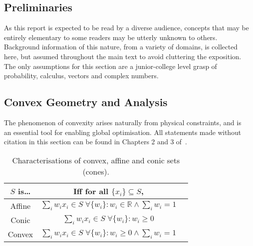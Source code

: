 \documentclass[10pt, a4paper]{article}
\numberwithin{equation}{section} %
\theoremstyle{definition}
\theoremstyle{plain}
\newenvironment{Tabular}[1] %
{\def\arraystretch{1.75}\begin{tabular}{#1}}
{\end{tabular}}
\newcommand{\?}{\mathrel{?}} %
\newcommand{\R}{\mathbb{R}} %
\begin{document}
                  \begin{appendices}

                    \section{Preliminaries}\label{sec:prelim}

                    As this report is expected to be read by a diverse audience, concepts that may be entirely elementary to some readers may be utterly unknown to others. Background information of this nature, from a variety of domains, is collected here, but assumed throughout the main text to avoid cluttering the exposition. The only assumptions for this section are a junior-college level grasp of probability, calculus, vectors and complex numbers.

                    \subsection{Convex Geometry and Analysis}\label{sec:prelim_cvxgeom}

                    The phenomenon of convexity arises naturally from physical constraints, and is an essential tool for enabling global optimisation. All statements made without citation in this section can be found in Chapters 2 and 3 of~\cite{BoydVand}.

                    \begin{table}[H]
                      \centering
                      \begin{Tabular}{ccl} 
                        \toprule
                        \(S\) is\ldots & Iff for all \(\{x_i\} \subseteq S\), \\
                        \midrule
                        Affine & \(\sum_i w_i x_i \in S\;\forall \{w_i\} : w_i \in \R \land \sum_i w_i = 1 \)  \\
                        Conic & \(\sum_i w_i x_i \in S\;\forall \{w_i\} : w_i \geq 0\)  \\
                        Convex & \(\sum_i w_i x_i \in S\;\forall \{w_i\} : w_i \geq 0 \land \sum_i w_i = 1 \)  \\
                        \bottomrule
                      \end{Tabular}
                      \caption{Characterisations of convex, affine and conic sets (cones).}\label{tab:sets}
                    \end{table}


\end{appendices}
\end{document}
